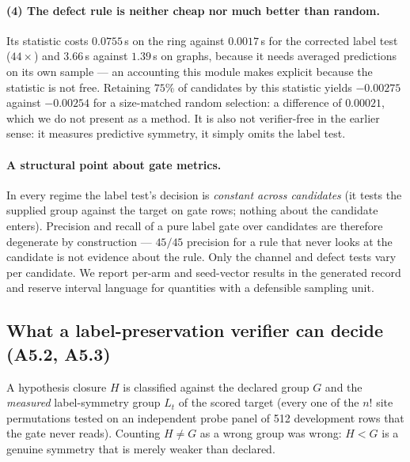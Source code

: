 \documentclass[11pt]{article}
\begin{document}
\paragraph{(4) The defect rule is neither cheap nor much better than random.} Its statistic
costs $0.0755$\,s on the ring against $0.0017$\,s for the corrected label test ($44\times$)
and $3.66$\,s against $1.39$\,s on graphs, because it needs averaged predictions on its own
sample --- an accounting this module makes explicit because the statistic is not free.
Retaining $75\%$ of candidates by this
statistic yields $-0.00275$ against $-0.00254$ for a size-matched random selection: a
difference of $0.00021$, which we do not present as a method. It is also not verifier-free in
the earlier sense: it measures predictive symmetry, it simply omits the label test.

\paragraph{A structural point about gate metrics.} In every regime the label test's decision
is \emph{constant across candidates} (it tests the supplied group against the target on gate
rows; nothing about the candidate enters). Precision and recall of a pure label gate over
candidates are therefore degenerate by construction --- $45/45$ precision for a rule that
never looks at the candidate is not evidence about the rule. Only the channel and defect tests
vary per candidate. We report per-arm and seed-vector results in the generated record and
reserve interval language for quantities with a defensible sampling unit.

\subsection{What a label-preservation verifier can decide (A5.2, A5.3)}
\label{sec:semantics}

A hypothesis closure $H$ is classified against the declared group $G$
and the \emph{measured} label-symmetry group $L_t$ of the scored target (every one of the
$n!$ site permutations tested on an independent probe panel of 512 development rows that the
gate never reads). Counting $H \ne G$ as a wrong group was wrong: $H < G$ is a genuine
symmetry that is merely weaker than declared.
\end{document}
